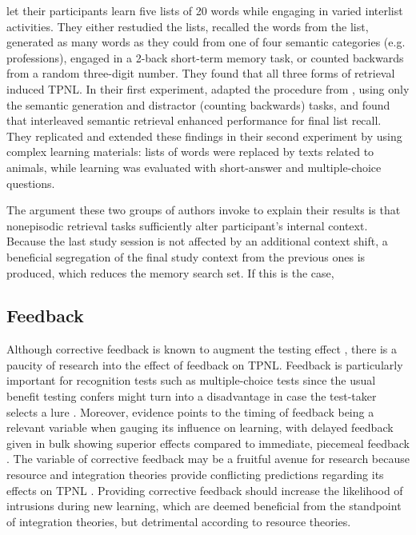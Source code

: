 \documentclass[../main.tex]{subfiles}
\begin{document}
\cite{pastotterRetrievalLearningFacilitates2011} let their participants learn 
five lists of 20 words while engaging in varied interlist activities. They 
either restudied the lists, recalled the words from the list, generated as many 
words as they could from one of four semantic categories (e.g. professions), 
engaged in a 2-back short-term memory task, or counted backwards from a random 
three-digit number. They found that all three forms of retrieval induced TPNL. 
In their first experiment, \cite{divisRetrievalSpeedsContext2014} adapted the 
procedure from \cite{pastotterRetrievalLearningFacilitates2011}, using only the 
semantic generation and distractor (counting backwards) tasks, and found that 
interleaved semantic retrieval enhanced performance for final list recall. They 
replicated and extended these findings in their second experiment by using 
complex learning materials: lists of words were replaced by texts related to 
animals, while learning was evaluated with short-answer and multiple-choice 
questions. 

The argument these two groups of authors invoke to explain their results is 
that nonepisodic retrieval tasks sufficiently alter participant's internal 
context. Because the last study session is not affected by an additional 
context shift, a beneficial segregation of the final study context from the 
previous ones is produced, which reduces the memory search set. If this is the 
case, 

\hypertarget{feedback}{%
\subsection{Feedback}}

Although corrective feedback is known to augment the testing effect 
\citep{roedigeriiiCriticalRoleRetrieval2011}, there is a paucity of research 
into the effect of feedback on TPNL. Feedback is particularly important for 
recognition tests such as multiple-choice tests since the usual benefit 
testing confers might turn into a disadvantage in case the test-taker 
selects a lure \citep{roedigerPositiveNegativeConsequences2005, 
marshMemorialConsequencesMultiplechoice2007}. Moreover, evidence points to 
the timing of feedback being a relevant variable when gauging its influence 
on learning, with delayed feedback given in bulk showing superior effects 
compared to immediate, piecemeal feedback 
\citep{metcalfeDelayedImmediateFeedback2009,butlerEffectTypeTiming2007, 
butlerFeedbackEnhancesPositive2008,smithLearningFeedbackSpacing2010}.
The variable of corrective feedback may be a fruitful avenue for research 
because resource and integration theories provide conflicting predictions 
regarding its effects on TPNL \citep{chanRetrievalPotentiatesNew2018}. 
Providing corrective feedback should increase the likelihood of intrusions 
during new learning, which are deemed beneficial from the standpoint of 
integration theories, but detrimental according to resource theories.
\end{document}
